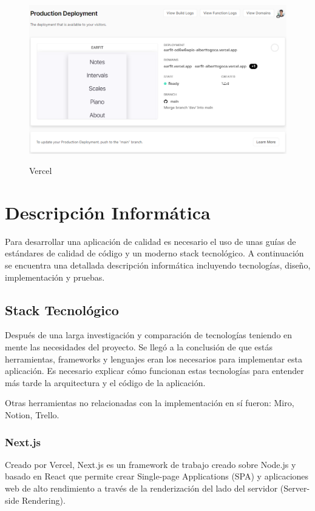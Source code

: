 \documentclass[12pt,twoside,titlepage]{report}
\begin{document}
\begin{figure}[H]
    \centering
    \includegraphics[scale=0.54]{Vercel}
    \label{fig:Vercel}
    \caption{Vercel}
\end{figure}

\section{Descripción Informática}

Para desarrollar una aplicación de calidad es necesario el uso de unas guías de estándares de calidad de código y un moderno stack tecnológico. A continuación se encuentra una detallada descripción informática incluyendo tecnologías, diseño, implementación y pruebas.

\subsection{Stack Tecnológico}

Después de una larga investigación y comparación de tecnologías teniendo en mente las necesidades del proyecto. Se llegó a la conclusión de que estás herramientas, frameworks y lenguajes eran los necesarios para implementar esta aplicación. Es necesario explicar cómo funcionan estas tecnologías para entender más tarde la arquitectura y el código de la aplicación.

Otras herramientas no relacionadas con la implementación en sí fueron: Miro, Notion, Trello.

\subsubsection{Next.js}

Creado por Vercel, Next.js es un framework de trabajo creado sobre Node.js y basado en React que permite crear Single-page Applications (SPA) y aplicaciones web de alto rendimiento a través de la renderización del lado del servidor (Server-side Rendering).
\end{document}

